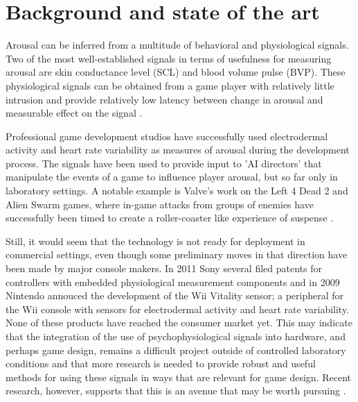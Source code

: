 \documentclass{llncs}
\begin{document}
\section{Background and state of the art}
Arousal can be inferred from a multitude of behavioral and physiological signals.%
Two of the most well-established signals in terms of usefulness for measuring arousal are skin conductance level (SCL) and blood volume pulse (BVP).
These physiological signals can be obtained from a game player with relatively little intrusion and provide relatively low latency between change in arousal and measurable effect on the signal \cite{picard1997affective,boucsein2011electrodermal}.

Professional game development studios have successfully used electrodermal activity and heart rate variability as measures of arousal during the development process. The signals have been used to provide input to 'AI directors' that manipulate the events of a game to influence player arousal, but so far only in laboratory settings.
A notable example is Valve's work on the Left 4 Dead 2 and Alien Swarm games, where in-game attacks from groups of enemies have successfully been timed to create a roller-coaster like experience of suspense \cite{ambinder2011}.

Still, it would seem that the technology is not ready for deployment in commercial settings, even though some preliminary moves in that direction have been made by major console makers. In 2011 Sony several filed patents for controllers with embedded physiological measurement components\cite{sonypatent} and in 2009 Nintendo annouced the development of the Wii Vitality sensor; a peripheral for the Wii console with sensors for electrodermal activity and heart rate variability\cite{wiivitality}. None of these products have reached the consumer market yet. This may indicate that the integration of the use of psychophysiological signals into hardware, and perhaps game design, remains a difficult project outside of controlled laboratory conditions and that more research is needed to provide robust and useful methods for using these signals in ways that are relevant for game design. Recent research, however, supports that this is an avenue that may be worth pursuing \cite{perez2011generic}.

\end{document}
